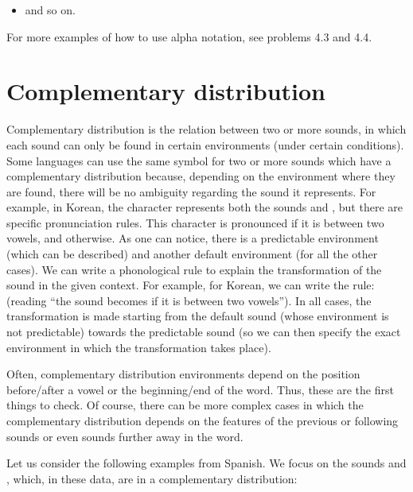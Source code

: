 \begin{refsection}
\begin{itemize}
\item {}
and so on.  

\end{itemize}

 For more examples of how to use alpha notation, see problems 4.3 and 4.4.

\hypertarget{complementary-distribution}{%
\section{\texorpdfstring{Complementary distribution}{Complementary distribution}}}

Complementary distribution is the relation between two or more sounds, in which each sound can only be found in certain environments (under certain conditions). Some languages can use the same symbol for two or more sounds which have a complementary distribution because, depending on the environment where they are found, there will be no ambiguity regarding the sound it represents. For example, in Korean, the character {} represents both the sounds  and , but there are specific pronunciation rules. This character is pronounced  if it is between two vowels, and  otherwise. As one can notice, there is a predictable environment (which can be described) and another default environment (for all the other cases). We can write a phonological rule to explain the transformation of the sound in the given context. For example, for Korean, we can write the rule:  (reading “the sound  becomes  if it is between two vowels”). In all cases, the transformation is made starting from the default sound (whose environment is not predictable) towards the predictable sound (so we can then specify the exact environment in which the transformation takes place).

Often, complementary distribution environments depend on the position before/after a vowel or the beginning/end of the word. Thus, these are the first things to check. Of course, there can be more complex cases in which the complementary distribution depends on the features of the previous or following sounds or even sounds further away in the word.

Let us consider the following examples from Spanish. We focus on the sounds  and , which, in these data, are in a complementary distribution:


\end{refsection}
